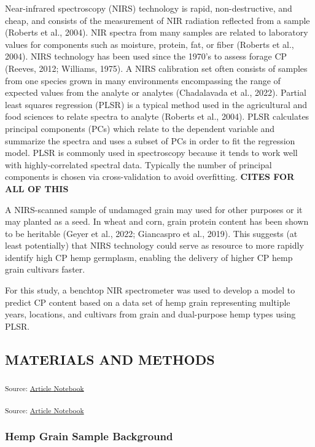 \documentclass[
]{agujournal2019}
\begin{document}
Near-infrared spectroscopy (NIRS) technology is rapid, non-destructive,
and cheap, and consists of the measurement of NIR radiation reflected
from a sample (Roberts et al., 2004). NIR spectra from many samples are
related to laboratory values for components such as moisture, protein,
fat, or fiber (Roberts et al., 2004). NIRS technology has been used
since the 1970's to assess forage CP (Reeves, 2012; Williams, 1975). A
NIRS calibration set often consists of samples from one species grown in
many environments encompassing the range of expected values from the
analyte or analytes (Chadalavada et al., 2022). Partial least squares
regression (PLSR) is a typical method used in the agricultural and food
sciences to relate spectra to analyte (Roberts et al., 2004). PLSR
calculates principal components (PCs) which relate to the dependent
variable and summarize the spectra and uses a subset of PCs in order to
fit the regression model. PLSR is commonly used in spectroscopy because
it tends to work well with highly-correlated spectral data. Typically
the number of principal components is chosen via cross-validation to
avoid overfitting. \textbf{CITES FOR ALL OF THIS}

A NIRS-scanned sample of undamaged grain may used for other purposes or
it may planted as a seed. In wheat and corn, grain protein content has
been shown to be heritable (Geyer et al., 2022; Giancaspro et al.,
2019). This suggests (at least potentially) that NIRS technology could
serve as resource to more rapidly identify high CP hemp germplasm,
enabling the delivery of higher CP hemp grain cultivars faster.

For this study, a benchtop NIR spectrometer was used to develop a model
to predict CP content based on a data set of hemp grain representing
multiple years, locations, and cultivars from grain and dual-purpose
hemp types using PLSR.

\subsection{MATERIALS AND METHODS}\label{materials-and-methods}

\textsubscript{Source:
\href{https://rvcrawford.github.io/glowing-system/index-preview.html}{Article
Notebook}}

\textsubscript{Source:
\href{https://rvcrawford.github.io/glowing-system/index-preview.html}{Article
Notebook}}

\subsubsection{Hemp Grain Sample
Background}\label{hemp-grain-sample-background}
\end{document}
